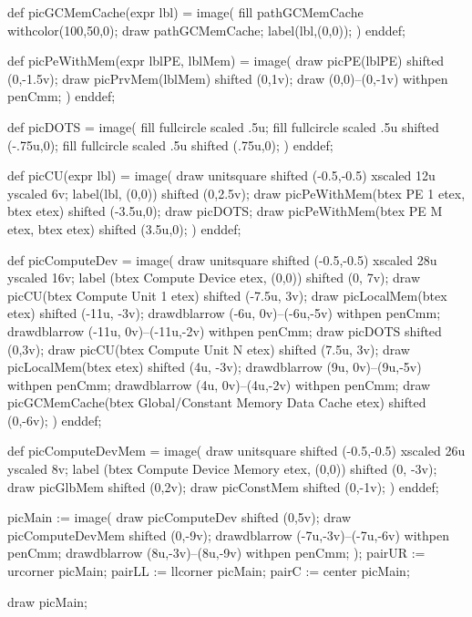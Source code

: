 def picGCMemCache(expr lbl) =
image(
fill pathGCMemCache withcolor(100,50,0);
draw pathGCMemCache;
label(lbl,(0,0));
)
enddef;

def picPeWithMem(expr lblPE, lblMem) =
image(
draw picPE(lblPE) shifted (0,-1.5v);
draw picPrvMem(lblMem) shifted (0,1v);
draw (0,0)--(0,-1v) withpen penCmm;
)
enddef;

def picDOTS =
image(
fill fullcircle scaled .5u;
fill fullcircle scaled .5u shifted (-.75u,0);
fill fullcircle scaled .5u shifted (.75u,0);
)
enddef;

def picCU(expr lbl) =
image(
	draw unitsquare shifted (-0.5,-0.5) xscaled 12u yscaled 6v;
	label(lbl, (0,0)) shifted (0,2.5v);
	draw picPeWithMem(btex PE 1 etex, btex  etex) shifted (-3.5u,0);
	draw picDOTS;
	draw picPeWithMem(btex PE M etex, btex  etex) shifted (3.5u,0);
)
enddef;

def picComputeDev =
image(
	draw unitsquare shifted (-0.5,-0.5) xscaled 28u yscaled 16v;
	label (btex Compute Device etex, (0,0)) shifted (0, 7v);
	draw picCU(btex Compute Unit 1 etex) shifted (-7.5u, 3v);
	draw picLocalMem(btex  etex) shifted (-11u, -3v);
	drawdblarrow (-6u, 0v)--(-6u,-5v) withpen penCmm;
	drawdblarrow (-11u, 0v)--(-11u,-2v) withpen penCmm;
	draw picDOTS shifted (0,3v);
	draw picCU(btex Compute Unit N etex) shifted (7.5u, 3v);
	draw picLocalMem(btex  etex) shifted (4u, -3v);
	drawdblarrow (9u, 0v)--(9u,-5v) withpen penCmm;
	drawdblarrow (4u, 0v)--(4u,-2v) withpen penCmm;
	draw picGCMemCache(btex Global/Constant Memory Data Cache etex) shifted (0,-6v);
)
enddef;

def picComputeDevMem =
image(
	draw unitsquare shifted (-0.5,-0.5) xscaled 26u yscaled 8v;
	label (btex Compute Device Memory etex, (0,0)) shifted (0, -3v);
	draw picGlbMem shifted (0,2v);
	draw picConstMem shifted (0,-1v);
)
enddef;

picMain := image(
	draw picComputeDev shifted (0,5v);
	draw picComputeDevMem shifted (0,-9v);
	drawdblarrow (-7u,-3v)--(-7u,-6v) withpen penCmm;
	drawdblarrow (8u,-3v)--(8u,-9v) withpen penCmm;
);
pairUR := urcorner picMain;
pairLL := llcorner picMain;
pairC := center picMain;


draw picMain;
\stopreusableMPgraphic
